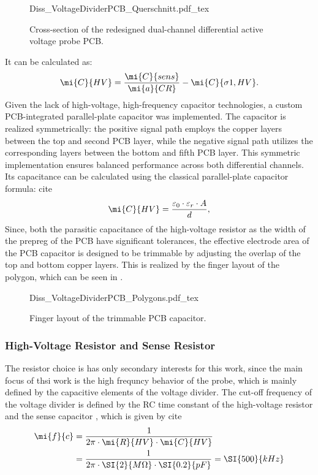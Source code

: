 \begin{figure}[ht]
	\centering
	{Diss_VoltageDividerPCB_Querschnitt.pdf_tex}
	\caption{Cross-section of the redesigned dual-channel differential active voltage probe PCB.}\label{fig:VoltageDividerPCB}
\end{figure}

It can be calculated as:
\begin{equation}
	\mi{C}{HV} = \frac{\mi{C}{sens}}{\mi{a}{CR}} - \mi{C}{\sigma 1,HV}.
\end{equation}
Given the lack of high-voltage, high-frequency capacitor technologies, a custom PCB-integrated parallel-plate capacitor was implemented. 
The capacitor is realized symmetrically: the positive signal path employs the copper layers between the top and second PCB layer, while the negative signal path utilizes the corresponding layers between the bottom and fifth PCB layer. 
This symmetric implementation ensures balanced performance across both differential channels.
Its capacitance can be calculated using the classical parallel-plate capacitor formula: cite
\begin{equation}
	\mi{C}{HV} = \frac{\varepsilon_0 \cdot \varepsilon_r \cdot A}{d},
\end{equation}
Since, both the parasitic capacitance  of the high-voltage resistor as the width of the prepreg of the PCB have significant tolerances, the effective electrode area of the PCB capacitor is designed to be trimmable by adjusting the overlap of the top and bottom copper layers.
This is realized by the finger layout of the polygon, which can be seen in .

\begin{figure}[ht]
	\centering
	{Diss_VoltageDividerPCB_Polygons.pdf_tex}
	\caption{Finger layout of the trimmable PCB capacitor.}\label{fig:VoltageDividerPCB_Polygon}
\end{figure}

\subsubsection*{High-Voltage Resistor  and Sense Resistor }
The resistor choice is has only secondary interests for this work, since the main focus of thsi work is the high frequncy behavior of the probe, which is mainly defined by the capacitive elements of the voltage divider.
The cut-off frequency of the voltage divider is defined by the RC time constant of the high-voltage resistor  and the sense capacitor , which is given by cite
\begin{align}	
	\mi{f}{c} &= \frac{1}{2\pi \cdot \mi{R}{HV} \cdot \mi{C}{HV}} \\
				&= \frac{1}{2\pi \cdot \SI{2}{M\Omega} \cdot \SI{0.2}{pF}} = \SI{500}{kHz}	
\end{align}

